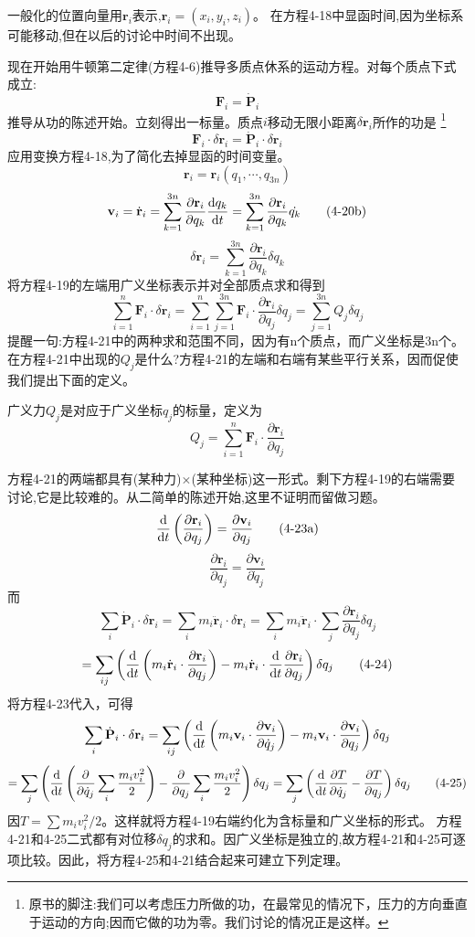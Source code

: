 一般化的位置向量用$\mathbf{r}_i$表示,$\mathbf{r}_i=(x_i,y_i,z_i)$。
在方程4-18中显函时间,因为坐标系可能移动,但在以后的讨论中时间不出现。

现在开始用牛顿第二定律(方程4-6)推导多质点休系的运动方程。对每个质点下式成立:
\[\mathbf{F}_i=\dot{\mathbf{P}}_i \tag{4-6}\]
推导从功的陈述开始。立刻得出一标量。质点$i$移动无限小距离$\delta \mathbf{r}_i$所作的功是
\footnote{原书的脚注:我们可以考虑压力所做的功，在最常见的情况下，压力的方向垂直于运动的方向;因而它做的功为零。我们讨论的情况正是这样。}
\[\mathbf{F}_i \cdot \delta \mathbf{r}_i=\dot{\mathbf{P}}_i \cdot \delta \mathbf{r}_i \tag{4-19}\]
应用变换方程4-18,为了简化去掉显函的时间变量。
\[\mathbf{r}_i=\mathbf{r}_i(q_1,\cdots,q_{3n}) \tag{4-20a}\]
\[\mathbf{v}_i=\dot{\mathbf{r}}_i=\sum_{k=1}^{3n}\frac{\partial \mathbf{r}_i}{\partial q_k}\dv{q_k}{t}=\sum_{k=1}^{3n}\frac{\partial \mathbf{r}_i}{\partial q_k}\dot{q_k} \tag{4-20b}\]
\[\delta \mathbf{r}_i=\sum_{k=1}^{3n}\frac{\partial \mathbf{r}_i}{\partial q_k}\delta q_k \tag{4-20c}\]
将方程4-19的左端用广义坐标表示并对全部质点求和得到
\[\sum_{i=1}^n\mathbf{F}_i \cdot \delta \mathbf{r}_i=\sum_{i=1}^n\sum_{j=1}^{3n}\mathbf{F}_i \cdot \frac{\partial \mathbf{r}_i}{\partial q_j}\delta q_j= \sum_{j=1}^{3n}Q_j\delta q_j \tag{4-21}\]
提醒一句:方程4-21中的两种求和范围不同，因为有n个质点，而广义坐标是3n个。
在方程4-21中出现的$Q_j$是什么?方程4-21的左端和右端有某些平行关系，因而促使我们提出下面的定义。

\begin{definition}[广义力]
    广义力$Q_j$是对应于广义坐标$q_j$的标量，定义为
    \[Q_j=\sum_{i=1}^n\mathbf{F}_i \cdot \frac{\partial \mathbf{r}_i}{\partial q_j} \tag{4-22}\]
\end{definition}

方程4-21的两端都具有(某种力)$\times$(某种坐标)这一形式。剩下方程4-19的右端需要讨论,它是比较难的。从二简单的陈述开始,这里不证明而留做习题。
\[\dv{t}\left(\frac{\partial \mathbf{r}_i}{\partial q_j}\right)=\frac{\partial \mathbf{v}_i}{\partial q_j} \tag{4-23a}\]
\[\frac{\partial \mathbf{r}_i}{\partial q_j}=\frac{\partial \mathbf{v}_i}{\partial \dot{q}_j} \tag{4-23b}\]
而
\[\sum_i\dot{\mathbf{P}}_i \cdot \delta \mathbf{r}_i=\sum_im_i\ddot{\mathbf{r}}_i\cdot \delta \mathbf{r}_i=\sum_im_i\ddot{\mathbf{r}}_i\cdot\sum_j\frac{\partial \mathbf{r}_i}{\partial q_j}\delta q_j\]
\[=\sum_{ij}\left(\dv{t}\left(m_i\dot{\mathbf{r}}_i\cdot \frac{\partial \mathbf{r}_i}{\partial q_j}\right)-m_i\dot{\mathbf{r}}_i\cdot \dv{t}\frac{\partial \mathbf{r}_i}{\partial q_j}\right)\delta q_j \tag{4-24}\]
将方程4-23代入，可得
\[\sum_i\dot{\mathbf{P}}_i \cdot \delta \mathbf{r}_i=\sum_{ij}\left(\dv{t}\left(m_i\mathbf{v}_i\cdot \frac{\partial \mathbf{v}_i}{\partial \dot{q}_j}\right)-m_i\mathbf{v}_i \cdot \frac{\partial \mathbf{v}_i}{\partial q_j}\right)\delta q_j\]
\[=\sum_j\left(\dv{t}\left(\frac{\partial}{\partial \dot{q}_j}\sum_i\frac{m_iv_i^2}{2}\right)-\frac{\partial}{\partial q_j}\sum_i\frac{m_iv_i^2}{2}\right)\delta q_j=\sum_j\left(\dv{t}\frac{\partial T}{\partial \dot{q}_j}-\frac{\partial T}{\partial q_j}\right)\delta q_j \tag{4-25}\]
因$T=\sum m_iv_i^2/2$。这样就将方程4-19右端约化为含标量和广义坐标的形式。
方程4-21和4-25二式都有对位移$\delta q_j$的求和。因广义坐标是独立的,故方程4-21和4-25可逐项比较。因此，将方程4-25和4-21结合起来可建立下列定理。

